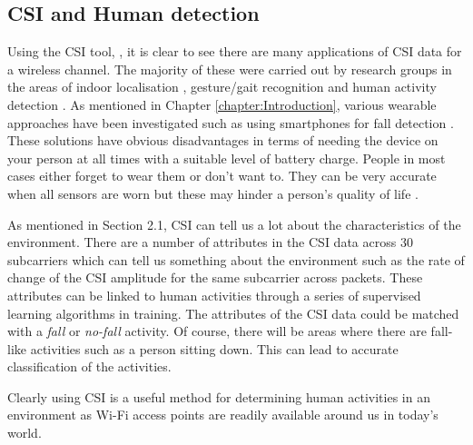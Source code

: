 \subsection{CSI and Human detection}
Using the CSI tool, \cite{Halperin_csitool}, it is clear to see there are many applications of CSI data for a wireless channel. The majority of these were carried out by research groups in the areas of indoor localisation \citep{FilaIndoor}, gesture/gait recognition \citep{gestureCSI,GaitRecogCSI}and human activity detection \citep{eEyesActivity}. As mentioned in Chapter \ref{chapter:Introduction}, various wearable approaches have been investigated such as using smartphones for fall detection \citep{smartPhoneFall}. These solutions have obvious disadvantages in terms of needing the device on your person at all times with a suitable level of battery charge. People in most cases either forget to wear them or don't want to. They can be very accurate when all sensors are worn but these may hinder a person's quality of life \citep{ElderlyWearable}. \par
As mentioned in Section 2.1, CSI can tell us a lot about the characteristics of the environment. There are a number of attributes in the CSI data across 30 subcarriers which can tell us something about the environment such as the rate of change of the CSI amplitude for the same subcarrier across packets. These attributes can be linked to human activities through a series of supervised learning algorithms in training. The attributes of the CSI data could be matched with a \textit{fall} or \textit{no-fall} activity. Of course, there will be areas where there are fall-like activities such as a person sitting down. This can lead to accurate classification of the activities. 

Clearly using CSI is a useful method for determining human activities in an environment as Wi-Fi access points are readily available around us in today's world. 

